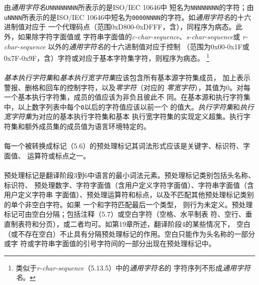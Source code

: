 由\textit{通用字符名}\texttt{\bs UNNNNNNNN}所表示的是ISO/IEC 10646中
短名为\texttt{NNNNNNNN}的字符；由\texttt{\bs uNNNN}所表示的是ISO/IEC
10646中短名为\texttt{0000NNNN}的字符。如\textit{通用字符名}的十六进制值对应于
一个代理码点（范围0xD800-0xDFFF，含），同程序为病态。此外，如果除字符字面值或
字符串字面值的\textit{c-char-sequence}、\textit{s-char-sequence}或
\textit{r-char-sequence} 以外的\textit{通用字符名}的十六进制值对应于控制
（范围为0x00-0x1F或0x7F-0x9F，含）字符或对应于基本字符集字符，则程序为病态。
\footnote{类似于\textit{r-char-sequence}（5.13.5）中的\textit{通用字符名}的
字符序列不形成\textit{通用字符名}。}

\paragraph{}
\textit{基本执行字符集}和\textit{基本执行宽字符集}应该包含所有基本源字符集成员，
加上表示警报、删格和回车的控制字符，以及\textit{零字符}（对应的
\textit{零宽字符}），其值为0。对每一个基本执行字符集，成员的值应该为非负且彼此不
同。在基本源和执行字符集中，以上数字列表中每个\texttt{0}以后的字符值应该以前一个
的值大。\textit{执行字符集}和\textit{执行宽字符集}为对应的基本执行字符集和基本
执行宽字符集的实现定义超集。执行字符集和额外成员集的成员值为语言环境特定的。


\paragraph{}
每一个被转换成标记（5.6）的预处理标记其词法形式应该是关键字、标识符、字面值、
运算符或标点之一。

\paragraph{}
预处理标记是翻译阶段3到6中语言的最小词法元素。预处理标记类别包括头名称、标识符、
预处理数字、字符字面值（含用户定义字符字面值）、字符串字面值（含用户定义字符串
字面值）、预处理运算符和标点，以及不匹配其他预处理标记类别的单个非空白字符。如果
一个\texttt{\sq{}}和\texttt{\dq{}}字符匹配最后一个类型，
则行为未定义。预处理标记可由空白分隔；包括注释（5.7）或空白字符（空格、水平制表
符、空行、垂直制表符和分页），或二者均可。如第19章所述，翻译阶段4的某些情况下，
空白（或不存在空白）不止具有分隔预处理标记的作用。空白只能作为头名称的一部分或字
符或字符串字面值的引号字符间的一部分出现在预处理标记中。

